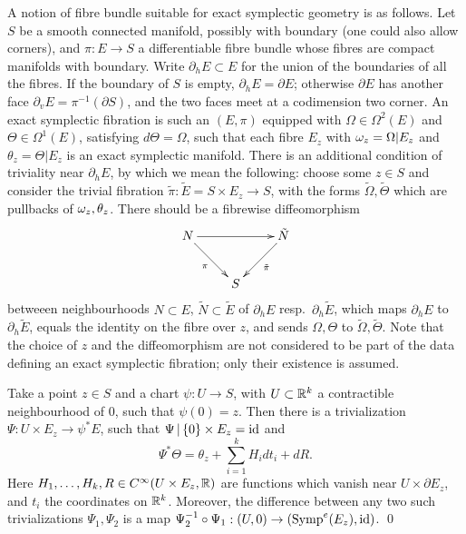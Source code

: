 \documentclass[10pt,letterpaper]{article}
\begin{document}
A notion of fibre bundle suitable for exact symplectic geometry is as follows.
Let $S$ be a smooth connected manifold, possibly with boundary (one could also
allow corners), and $\pi: E \rightarrow S$ a differentiable fibre bundle whose
fibres are compact manifolds with boundary. Write $\partial_hE \subset E$ for
the union of the boundaries of all the fibres. If the boundary of $S$ is empty,
$\partial_hE = \partial E$; otherwise $\partial E$ has another face
$\partial_vE = \pi^{-1}(\partial S)$, and the two faces meet at a codimension
two corner. An exact symplectic fibration is such an $(E,\pi)$ equipped with
$\Omega \in \Omega^2(E)$ and $\Theta \in \Omega^1(E)$, satisfying $d\Theta =
\Omega$, such that each fibre $E_z$ with $\omega_z = \Omega|E_z$ and $\theta_z =
\Theta|E_z$ is an exact symplectic manifold. There is an additional condition
of triviality near $\partial_hE$, by which we mean the following: choose some
$z \in S$ and consider the trivial fibration $\tilde{\pi} : \tilde{E} = S
\times E_z \rightarrow S$, with the forms $\tilde{\Omega},\tilde{\Theta}$ which
are pullbacks of $\omega_z,\theta_z$. There should be a fibrewise diffeomorphism
\begin{equation} \label{eq:boundary-trivialization}
\xymatrix{
 {N} \ar[rr] \ar[dr]_{\pi} && {\tilde{N}} \ar[dl]^{\tilde{\pi}} \\
 & {S} &
}
\end{equation}
betweeen neighbourhoods $N \subset E$, $\tilde{N} \subset \tilde{E}$ of
$\partial_hE$ resp.\ $\partial_h\tilde{E}$, which maps $\partial_hE$ to
$\partial_h\tilde{E}$, equals the identity on the fibre over $z$, and sends
$\Omega,\Theta$ to $\tilde{\Omega},\tilde{\Theta}$. Note that the choice of $z$
and the diffeomorphism are not considered to be part of the data defining an
exact symplectic fibration; only their existence is assumed.

\begin{lemma} \label{th:fibre-bundles}
Take a point $z \in S$ and a chart $\psi: U \rightarrow S$, with $U \subset
\mathbb{R}^k$ a contractible neighbourhood of $0$, such that $\psi(0) = z$. Then there
is a trivialization $\Psi: U \times E_z \rightarrow \psi^*E$, such that
$\Psi\,|\,\{0\} \times E_z = \mathrm{id}$ and
\[
\Psi^*\Theta = \theta_z + \sum_{i=1}^k H_i dt_i + dR.
\]
Here $H_1,\dots,H_k,R \in C^\infty(U \times E_z,\mathbb{R})$ are functions which vanish
near $U \times \partial E_z$, and $t_i$ the coordinates on $\mathbb{R}^k$. Moreover,
the difference between any two such trivializations $\Psi_1,\Psi_2$ is a map
$\Psi_2^{-1} \circ \Psi_1: (U,0) \rightarrow (\mathrm{Symp}^e(E_z),\mathrm{id})$. \qed
\end{lemma}
\end{document}
